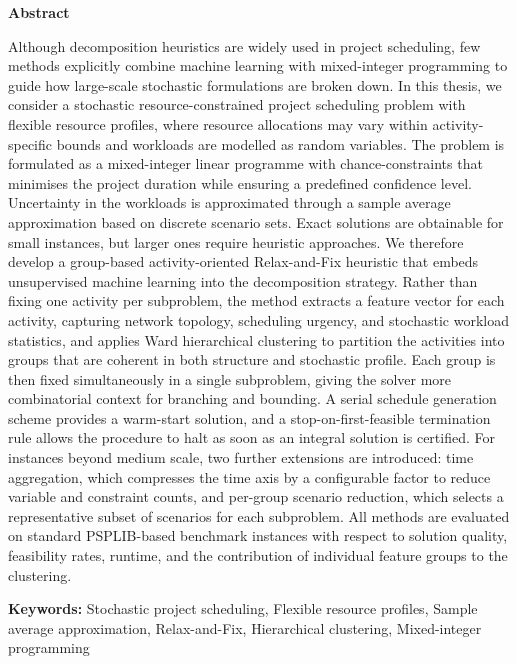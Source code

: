 
\begin{center}
  {\Large\bfseries Abstract}
\end{center}
\vspace{0.5cm}

Although decomposition heuristics are widely used in project
scheduling, few methods explicitly combine machine learning with
mixed-integer programming to guide how large-scale stochastic
formulations are broken down. In this thesis, we consider a
stochastic resource-constrained project scheduling problem with
flexible resource profiles, where resource allocations may vary
within activity-specific bounds and workloads are modelled as
random variables. The problem is formulated as a mixed-integer
linear programme with chance-constraints that minimises the
project duration while ensuring a predefined confidence level.
Uncertainty in the workloads is approximated through a sample
average approximation based on discrete scenario sets. Exact
solutions are obtainable for small instances, but larger ones
require heuristic approaches. We therefore develop a group-based
activity-oriented Relax-and-Fix heuristic that embeds
unsupervised machine learning into the decomposition strategy.
Rather than fixing one activity per subproblem, the method
extracts a feature vector for each activity, capturing network
topology, scheduling urgency, and stochastic workload statistics,
and applies Ward hierarchical clustering to partition the
activities into groups that are coherent in both structure and
stochastic profile. Each group is then fixed simultaneously in a
single subproblem, giving the solver more combinatorial context
for branching and bounding. A serial schedule generation scheme
provides a warm-start solution, and a stop-on-first-feasible
termination rule allows the procedure to halt as soon as an
integral solution is certified. For instances beyond medium
scale, two further extensions are introduced: time aggregation,
which compresses the time axis by a configurable factor to reduce
variable and constraint counts, and per-group scenario reduction,
which selects a representative subset of scenarios for each
subproblem. All methods are evaluated on standard PSPLIB-based
benchmark instances with respect to solution quality, feasibility
rates, runtime, and the contribution of individual feature groups
to the clustering.

\vspace{0.5em}
\noindent\textbf{Keywords:}
Stochastic project scheduling, Flexible resource profiles, Sample average approximation, Relax-and-Fix, Hierarchical clustering, Mixed-integer programming
